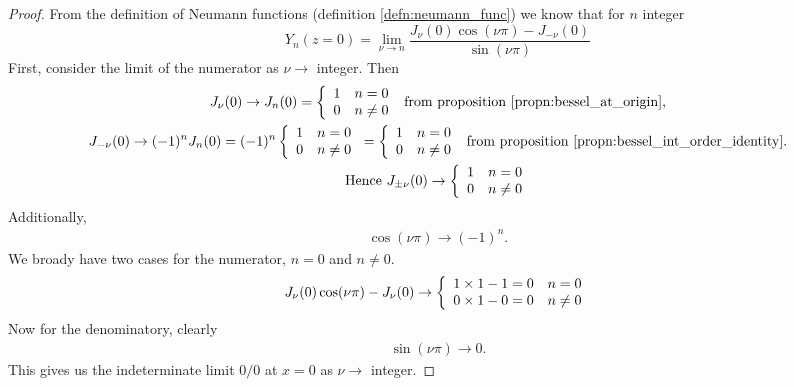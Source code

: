   \begin{proof}
    From the definition of Neumann functions (definition \ref{defn:neumann_func}) we know that for $n$ integer
      \begin{equation}
        Y_n(z=0) = \lim_{\nu \rightarrow n} \frac{J_\nu(0) \cos (\nu \pi) - J_{-\nu}(0)}{\sin (\nu \pi)}
      \end{equation}
    First, consider the limit of the numerator as $\nu \rightarrow$ integer. Then
      \begin{gather*}
        J_\nu(0) \rightarrow
          J_n(0) = \left\{
            \begin{array}{c l}
                 1 & n = 0 \\
                 0 & n \neq 0
            \end{array}\right. \text{ from proposition \ref{propn:bessel_at_origin},}\\
        J_{-\nu}(0) \rightarrow
          (-1)^nJ_n(0) = (-1)^n\left\{
            \begin{array}{c l}
                 1 & n = 0 \\
                 0 & n \neq 0
            \end{array}\right.
            = \left\{
              \begin{array}{c l}
                   1 & n = 0 \\
                   0 & n \neq 0
              \end{array}\right. \text{ from proposition \ref{propn:bessel_int_order_identity}.}\\
        \text{Hence } J_{\pm\nu}(0) \rightarrow
          \left\{
            \begin{array}{c l}
                 1 & n = 0 \\
                 0 & n \neq 0
            \end{array}\right.
      \end{gather*}
    Additionally,
      \begin{gather*}
        \cos(\nu\pi) \rightarrow (-1)^n.
      \end{gather*}
    We broady have two cases for the numerator, $n=0$ and $n\neq 0$.
      \begin{gather*}
        J_\nu(0)\cos(\nu\pi) - J_\nu(0) \rightarrow
        \left\{
          \begin{array}{c l}
               1\times1-1=0 & n = 0 \\
               0\times1-0=0 & n \neq 0
          \end{array}\right.
      \end{gather*}
    Now for the denominatory, clearly
      \begin{gather*}
        \sin(\nu\pi) \rightarrow 0.
      \end{gather*}
    This gives us the indeterminate limit $0/0$ at $x=0$ as $\nu \rightarrow$ integer.
  \end{proof}

